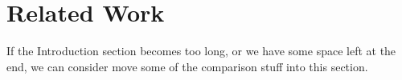 \section{Related Work}
If the Introduction section becomes too long, or we have some space left at the end, we can consider move some of the comparison stuff into this section.